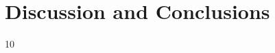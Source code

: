 \documentclass[sigconf, nonacm]{acmart}
\begin{document}

\section{Discussion and Conclusions}\label{sec:discussion}



\begin{thebibliography}{10}


\end{thebibliography}
\end{document}

